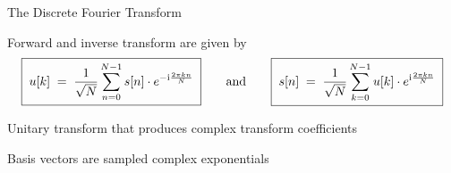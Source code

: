 \begin{frame}{The Discrete Fourier Transform}
  \bit
  \item Forward and inverse transform are given by
  \vspace{-.5ex}\begin{align*}
    \boxed{\;u[k]\;=\;\frac{1}{\sqrt{N}}\sum_{n=0}^{N-1}s[n]\cdot e^{-\mathrm{i}\frac{2\pi k n}{N}}\;}
    \qquad\text{and}\qquad
    \boxed{\;s[n]\;=\;\frac{1}{\sqrt{N}}\sum_{k=0}^{N-1}u[k]\cdot e^{\mathrm{i}\frac{2\pi k n}{N}}\;}
  \end{align*}
  \item<5->[\iarrow] Unitary transform that produces complex transform coefficients
  \item<6->[\iarrow] Basis vectors are sampled complex exponentials
  \eit
  \onslide
\end{frame}

